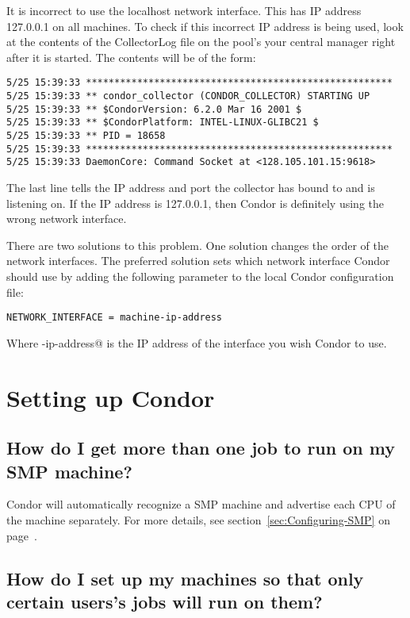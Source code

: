It is incorrect to use the localhost network interface.
This has IP address 127.0.0.1 on all machines.
To check if this incorrect IP address is being used,
look at the contents of the
CollectorLog file on the pool's
your central manager right after it is started.  
The contents will be of the form:

\begin{verbatim}
5/25 15:39:33 ******************************************************
5/25 15:39:33 ** condor_collector (CONDOR_COLLECTOR) STARTING UP
5/25 15:39:33 ** $CondorVersion: 6.2.0 Mar 16 2001 $
5/25 15:39:33 ** $CondorPlatform: INTEL-LINUX-GLIBC21 $
5/25 15:39:33 ** PID = 18658
5/25 15:39:33 ******************************************************
5/25 15:39:33 DaemonCore: Command Socket at <128.105.101.15:9618>
\end{verbatim}

The last line tells the IP address and port the collector has
bound to and is listening on.
If the IP address is 127.0.0.1, then Condor is definitely using the wrong
network interface.

There are two solutions to this problem.
One solution changes the order of the network interfaces.
The preferred solution
sets which network interface Condor should use
by adding the following parameter to the
local Condor configuration file:

\begin{verbatim}NETWORK_INTERFACE = machine-ip-address\end{verbatim}

Where \verb@machine-ip-address@ is the IP address of the interface you wish
Condor to use.

\section{Setting up Condor}

\subsection{How do I get more than one job to run on my SMP machine?}

Condor will automatically recognize a SMP machine and advertise each
CPU of the machine separately.
For more details, see section~\ref{sec:Configuring-SMP} on
page~\pageref{sec:Configuring-SMP}.

\subsection{How do I set up my machines so that only certain users's
jobs will run on them?}


